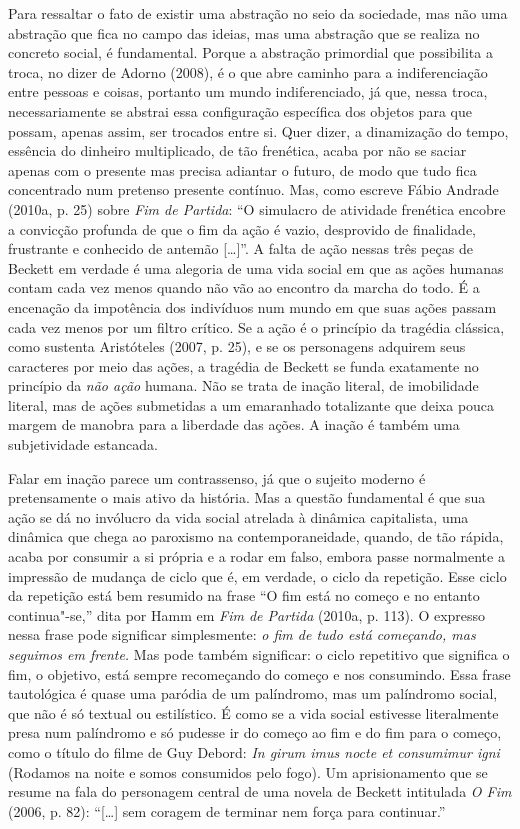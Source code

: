 Para ressaltar o fato de existir uma abstração no seio da
sociedade, mas não uma abstração que fica no campo das ideias, mas uma
abstração que se realiza no concreto social, é fundamental. Porque a
abstração primordial que possibilita a troca, no dizer de Adorno (2008),
é o que abre caminho para a indiferenciação entre pessoas e coisas,
portanto um mundo indiferenciado, já que, nessa troca, necessariamente
se abstrai essa configuração específica dos objetos para que possam,
apenas assim, ser trocados entre si. Quer dizer, a dinamização do tempo,
essência do dinheiro multiplicado, de tão frenética, acaba por não se
saciar apenas com o presente mas precisa adiantar o futuro, de modo que
tudo fica concentrado num pretenso presente contínuo. Mas, como escreve
Fábio Andrade (2010a, p. 25) sobre \emph{Fim de Partida}: ``O simulacro
de atividade frenética encobre a convicção profunda de que o fim da ação
é vazio, desprovido de finalidade, frustrante e conhecido de antemão
[\ldots{}]''. A falta de ação nessas três peças de Beckett em verdade é
uma alegoria de uma vida social em que as ações humanas contam cada vez
menos quando não vão ao encontro da marcha do todo. É a encenação da
impotência dos indivíduos num mundo em que suas ações passam cada vez
menos por um filtro crítico. Se a ação é o princípio da tragédia
clássica, como sustenta Aristóteles (2007, p. 25), e se os personagens
adquirem seus caracteres por meio das ações, a tragédia de Beckett se
funda exatamente no princípio da \emph{não ação} humana. Não se trata de
inação literal, de imobilidade literal, mas de ações submetidas a um
emaranhado totalizante que deixa pouca margem de manobra para a
liberdade das ações. A inação é também uma subjetividade estancada.

Falar em inação parece um contrassenso, já que o sujeito moderno é
pretensamente o mais ativo da história. Mas a questão fundamental é que
sua ação se dá no invólucro da vida social atrelada à dinâmica
capitalista, uma dinâmica que chega ao paroxismo na contemporaneidade,
quando, de tão rápida, acaba por consumir a si própria e a rodar em
falso, embora passe normalmente a impressão de mudança de ciclo que é,
em verdade, o ciclo da repetição. Esse ciclo da repetição está bem
resumido na frase ``O fim está no começo e no entanto continua"-se,''
dita por Hamm em \emph{Fim de Partida} (2010a, p. 113). O
expresso nessa frase pode significar simplesmente: \emph{o fim de tudo
está começando, mas seguimos em frente.} Mas pode também significar: o
ciclo repetitivo que significa o fim, o objetivo, está sempre
recomeçando do começo e nos consumindo. Essa frase tautológica é quase
uma paródia de um palíndromo, mas um palíndromo social, que não é só
textual ou estilístico. É como se a vida social estivesse literalmente
presa num palíndromo e só pudesse ir do começo ao fim e do fim para o
começo, como o título do filme de Guy Debord:
\emph{In girum imus nocte et consumimur igni} (Rodamos na noite e somos
consumidos pelo fogo). Um aprisionamento que se resume na fala do
personagem central de uma novela de Beckett intitulada \emph{O Fim}
(2006, p. 82): ``[\ldots{}] sem coragem de terminar nem força para
continuar.''

